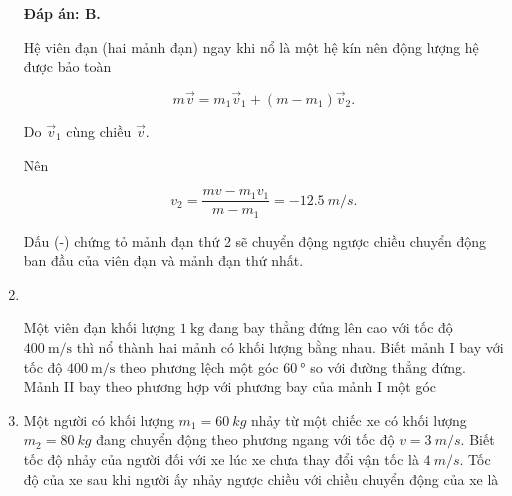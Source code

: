 \begin{enumerate}[label=\bfseries Câu \arabic*:, leftmargin=1.5cm]
\hideall
{	
	\textbf{Đáp án: B.}
	
	Hệ viên đạn (hai mảnh đạn) ngay khi nổ là một hệ kín nên động lượng hệ được bảo toàn
	
	$$m\vec v = m_1 \vec v_1 + (m-m_1)\vec v_2.$$
	
	Do $\vec v_1$ cùng chiều $\vec v$.
	
	Nên 
	
	$$v_2 = \dfrac{mv - m_1v_1}{m-m_1} = -\SI{12,5}{m/s}.$$
	
	Dấu (-) chứng tỏ mảnh đạn thứ 2 sẽ chuyển động ngược chiều chuyển động ban đầu của viên đạn và mảnh đạn thứ nhất.
}


\item {}\\
{Một viên đạn khối lượng $\SI{1}{\kilogram}$ đang bay thẳng đứng lên cao với tốc độ $\SI{400}{\meter/\second}$ thì nổ thành hai mảnh có khối lượng bằng nhau. Biết mảnh I bay với tốc độ $\SI{400}{\meter/\second}$ theo phương lệch một góc $\SI{60}{\degree}$ so với đường thẳng đứng. Mảnh II bay theo phương hợp với phương bay của mảnh I một góc
	\begin{mcq}(4)
		\item $\SI{75}{\degree}$.
		\item $\SI{90}{\degree}$.
		\item $\SI{30}{\degree}$.
		\item $\SI{120}{\degree}$.
	\end{mcq}
}

	\item {}
	
	
	{Một người có khối lượng $m_1=\SI{60}{kg}$ nhảy từ một chiếc xe có khối lượng $m_2 = \SI{80}{kg}$ đang chuyển động theo phương ngang với tốc độ $v = \SI{3}{m/s}$. Biết tốc độ nhảy của người đối với xe lúc xe chưa thay đổi vận tốc là $\SI{4}{m/s}$. Tốc độ của xe sau khi người ấy nhảy ngược chiều với chiều chuyển động của xe là
	}
	

\end{enumerate}
